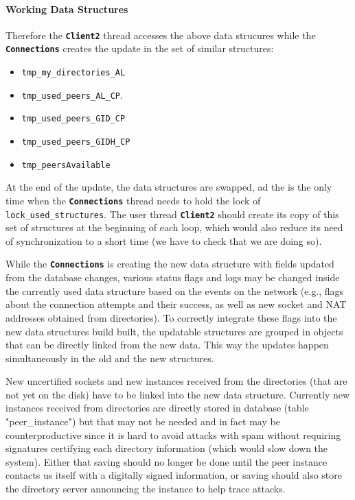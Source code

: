 \documentclass{book}
\newcommand{\cls}[1]{{\tt\bf #1}}
\newcommand{\mmb}[1]{{\tt #1}}
\begin{document}
\paragraph{Working Data Structures}
Therefore the \cls{Client2} thread accesses the above data strucures while the \cls{Connections} creates the update in
the set of similar structures:
\begin{itemize}
\item
\mmb{tmp\_my\_directories\_AL}
\item
\mmb{tmp\_used\_peers\_AL\_CP}.
\item
\mmb{tmp\_used\_peers\_GID\_CP}
\item
\mmb{tmp\_used\_peers\_GIDH\_CP}
\item
\mmb{tmp\_peersAvailable}
\end{itemize}
At the end of the update, the data structures are swapped, ad the is the only time when the \cls{Connections} thread needs to 
hold the lock of \mmb{lock\_used\_structures}. The user thread \cls{Client2} should create its copy of this set of structures 
at the beginning of each loop, which would also reduce its need of synchronization to a short time (we have to check that 
we are doing so).

While the \cls{Connections} is creating the new data structure with fields updated from the database changes, various
status flags and logs may be changed inside the currently used data structure based on the events on the network
(e.g., flags about the connection attempts and their success, as well as new socket and NAT addresses 
obtained from directories). To correctly integrate these flags into the new data structures build built,
the updatable structures are grouped in objects that can be directly linked from the new data. This way the updates
happen simultaneously in the old and the new structures.

New uncertified sockets and new instances received from the directories (that are not yet on the disk) have to be 
linked into the new data structure. Currently new instances received from directories are directly stored in database (table "peer\_instance")
but that may not be needed and in fact may be counterproductive since it is hard to avoid attacks with spam
without requiring signatures certifying each directory information (which would slow down the system). Either
that saving should no longer be done until the peer instance contacts us itself with a digitally signed information,
or saving should also store the directory server announcing the instance to help trace attacks.
\end{document}
